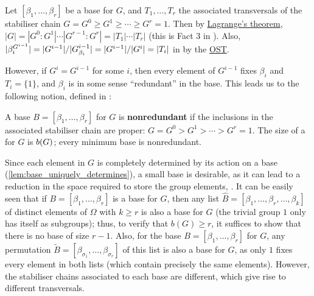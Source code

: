 \begin{proposition}\label{prop:stabiliser_chain_indexes}
    Let $[\beta_1,\dotsc,\beta_r]$ be a base for $G$, and $T_1,\dotsc,T_r$ the associated transversals of the stabiliser chain $G = G^0 \geq G^1 \geq \dotsb \geq G^r = 1$. Then by \hyperref[thm:lagrange]{Lagrange's theorem}, $|G| = |G^0 : G^1| \dotsb |G^{r-1} : G^r| = |T_1| \dotsb |T_r|$ (this is Fact 3 in \cite{blaha1992}). Also, $|\beta_i^{G^{i-1}}| = |G^{i-1}|/|\added{2}{G^{i-1}_{\beta_i}}| = |G^{i-1}|/|G^i| = |T_i|$ in  by the \hyperref[thm:orbit_stabiliser]{OST}. \qedhere
\end{proposition}

However, if $G^i = G^{i-1}$ for some $i$, then every element of $G^{i-1}$ fixes $\beta_i$ and $T_i = \{1\}$, and $\beta_i$ is in some sense ``redundant'' in the base.  This leads us to the following notion, defined in \cite{blaha1992}:

\begin{definition}\label{def:nonredundant_base}
    A base $B = [\beta_1,\dotsc,\beta_r]$ for $G$ is \textbf{nonredundant} if the inclusions in the associated stabiliser chain are proper: $G = G^0 > G^1 > \dotsb > G^r = 1$. The size of a  for $G$ is  $\added{2}{b(G)}$; every minimum base is nonredundant.
\end{definition}

Since each element in $G$ is completely determined by its action on a base (\autoref{lem:base_uniquely_determines}), a small base is desirable, as it can lead to a reduction in the space required to store the group elements,  \cite{blaha1992}. It can be easily seen that if $B = [\beta_1,\dotsc,\beta_r]$ is a base for $G$, then any list $\hat B = [\beta_1,\dotsc,\beta_r,\dotsc,\beta_k]$ of distinct elements of $\Omega$ with $k \geq r$ is also a base for $G$ (the trivial group $1$ only has itself as subgroups); thus, to verify that $b(G) \geq r$, it suffices to show that there is no base of size $r-1$. Also, for the base $B = [\beta_1,\dotsc,\beta_r]$ for $G$, any permutation $\tilde B = [\beta_{\sigma_1},\dotsc,\beta_{\sigma_r}]$ of this list is also a base for $G$, as only $1$ fixes every element in both lists (which contain precisely the same elements). However, the stabiliser chains associated to each base are different, which give rise to different transversals.

